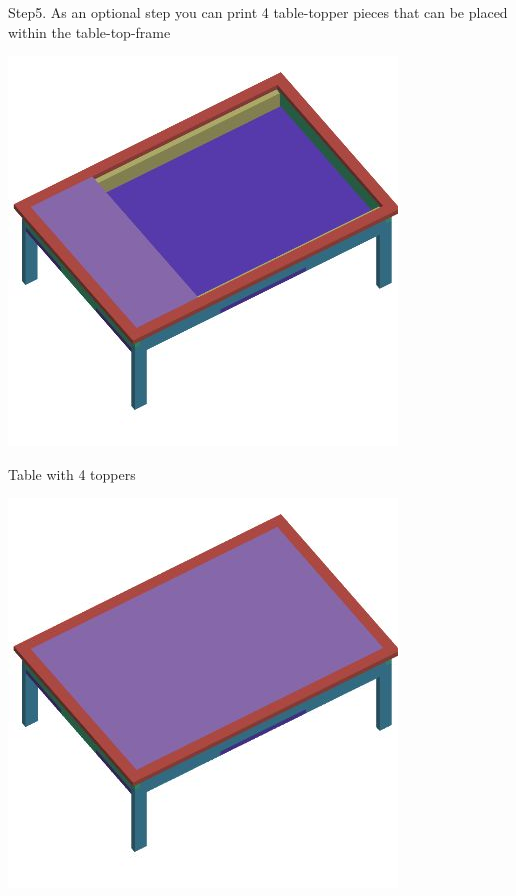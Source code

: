 \documentclass[]{article}
\begin{document}
		\newpage
				
		Step5. As an optional step you can print 4 table-topper pieces that can be placed within the table-top-frame

		\includegraphics[width=0.5\linewidth]{img/jpg/table-5.jpg}
		
		Table with 4 toppers	
		
		\includegraphics[width=0.5\linewidth]{img/jpg/table-6.jpg}	
				
\end{document}
